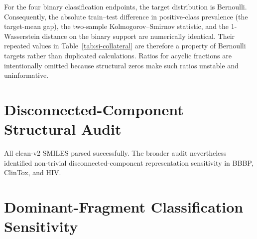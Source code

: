 

For the four binary classification endpoints, the target distribution is Bernoulli. Consequently, the absolute train--test difference in positive-class prevalence (the target-mean gap), the two-sample Kolmogorov--Smirnov statistic, and the 1-Wasserstein distance on the binary support are numerically identical. Their repeated values in Table~\ref{tab:si-collateral} are therefore a property of Bernoulli targets rather than duplicated calculations. Ratios for acyclic fractions are intentionally omitted because structural zeros make such ratios unstable and uninformative.

\section{Disconnected-Component Structural Audit}
\label{sec:si-fragment-audit}

All clean-v2 SMILES parsed successfully. The broader audit nevertheless identified non-trivial disconnected-component representation sensitivity in BBBP, ClinTox, and HIV.

\begin{table}[!htbp]
\centering
\caption{Multi-component and deterministic dominant-fragment audit. Similarity is the Morgan Tanimoto coefficient between the source-faithful complete record and the selected dominant fragment.}
\label{tab:si-fragment-audit}
\scriptsize
{}
\end{table}

\section{Dominant-Fragment Classification Sensitivity}
\label{sec:si-dominant}

